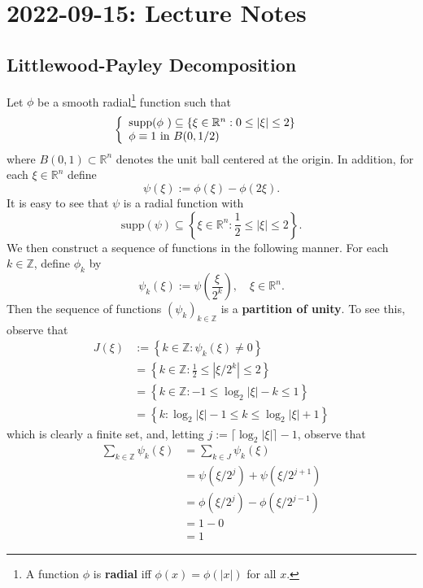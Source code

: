 \documentclass{article}
\makeatletter
\def\R{\mathbb{R}} %
\def\Z{\mathbb{Z}} %
\newcommand{\curly}[2]{\left\{ \begin{array}{l@{\quad}l}#1\\#2\end{array}\right.}
\makeatother
\begin{document}
\section{2022-09-15: Lecture Notes}

\subsection{Littlewood-Payley Decomposition}
Let $\phi$ be a smooth radial\footnote{A function $\phi$ is \textbf{radial} iff
  $\phi(x)=\phi(|x|)$ for all $x$.} function such that
\begin{equation*}
  \curly{\text{supp($\phi$ )}\subseteq \left\{\xi\in \R^{n}: 0 \leq |\xi| \leq
      2\right\}}{\phi\equiv 1 \text{ in }B(0,1/2)}
\end{equation*}
where $B(0,1)\subset \R^{n}$ denotes the unit ball centered at the origin. In
addition, for each $\xi\in \R^{n}$ define
\begin{equation*}
  \psi(\xi):= \phi(\xi)- \phi(2\xi).
\end{equation*}
It is easy to see that $\psi$ is a radial function with
\begin{equation}
  \label{eq:support-of-psi}
  \text{supp}(\psi) \subseteq \left\{\xi\in \R^{n}: \frac{1}{2} \leq |\xi| \leq 2\right\}.
\end{equation}
We then construct a sequence of functions in the following manner. For each $k\in
\Z$,  define $\phi_{k}$ by 
\begin{equation*}
  \psi_{k}(\xi):= \psi\left(\frac{\xi}{2^{k}}\right), \quad \xi\in \R^n.
\end{equation*}
Then the sequence of functions $(\psi_{k})_{k\in\Z}$ is a \textbf{partition of
  unity}. To see this, observe that
\begin{align*}
  J(\xi)
  &:= \left\{k\in \Z : \psi_{k}(\xi) \neq 0 \right\}\\
  &= \left\{k\in \Z : \frac{1}{2} \leq |\xi/2^{k}| \leq 2\right\} \\
  &= \left\{k\in \Z : -1 \leq \log_{2}|\xi| - k \leq 1\right\} \\
  &= \left\{k : \log_{2}|\xi|-1 \leq k \leq \log_{2}|\xi| +1 \right\}
\end{align*}
which is clearly a finite set, and, letting $j:=\lceil \log_{2}|\xi| \rceil-1$,  observe that
\begin{align*}
  \sum_{k\in \Z} \psi_{k}(\xi) 
  &= \sum_{k\in J}\psi_{k}(\xi)\\
  &= \psi(\xi/2^{j}) + \psi(\xi/2^{j+1})\\
  &= \phi(\xi/2^{j}) - \phi(\xi/2^{j-1})\\
  &= 1-0\\
  &= 1
\end{align*}
\end{document}
